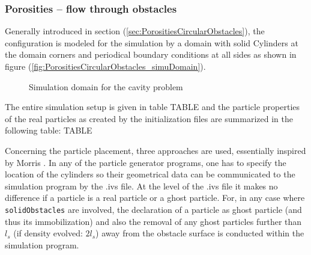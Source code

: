 \documentclass{report}
\begin{document}
\subsubsection{Porosities -- flow through obstacles}
\label{sec:SimuSetup_flowThroughObstacles}

Generally introduced in section (\ref{sec:PorositiesCircularObstacles}), the configuration is modeled for the simulation by a domain with solid Cylinders at the domain corners and periodical boundary conditions at all sides as shown in figure (\ref{fig:PorositiesCircularObstacles_simuDomain}). 

\begin{figure}[!htbp]
  \centering
  \caption{Simulation domain for the cavity problem }
  \label{fig:PorositiesCavitiesSimuDomain}
\end{figure}

 The entire simulation setup is given in table TABLE and the particle properties of the real particles as created by the initialization files are summarized in the following table:
\linebreak[2]
TABLE
\linebreak[2]

Concerning the particle placement, three approaches are used, essentially inspired by Morris \cite{Morris1997, Zhu1999}. In any of the particle generator programs, one has to specify the location of the cylinders so their geometrical data can be communicated to the simulation program by the .ivs file. At the level of the .ivs file it makes no difference if a particle is a real particle or a ghost particle. For, in any case where {\tt solidObstacles} are involved, the declaration of a particle as ghost particle (and thus its immobilization) and also the removal of any ghost particles further than $l_s$ (if density evolved: $2l_s$) away from the obstacle surface is conducted within the simulation program. 
\end{document}
